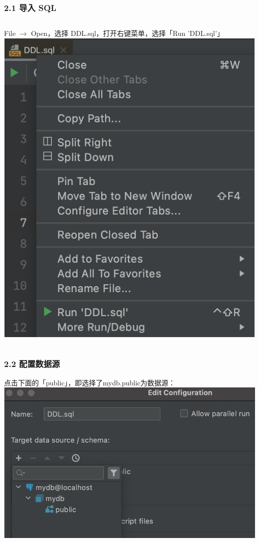\documentclass[aspectratio=169, 14pt]{beamer}
\begin{document}
\begin{frame}
	\frametitle{2.1 导入 SQL}
	\begin{columns}
		File $\rightarrow$ Open，选择 \alert{DDL.sql}，打开右键菜单，选择「Run 'DDL.sql'」
		\includegraphics[height=.9\paperheight]{week4/ddl}
	\end{columns}

\end{frame}

\begin{frame}
	\frametitle{2.2 配置数据源}
	点击下面的「public」，即选择了mydb.public为数据源：
	\includegraphics[height=.8\paperheight]{week4/public-source}
\end{frame}
\end{document}
